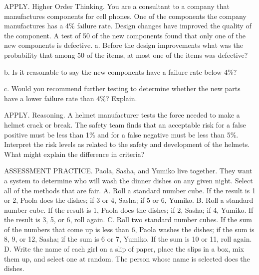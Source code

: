 \documentclass{article}
\newenvironment{practice}[2]{}{}        %
\newcommand{\answer}[1]{}               %
\newcommand{\uncertain}[2]{#1}          %
\newcommand{\te}[1]{}                   %
\begin{document}
\begin{practice}{22}{3}
APPLY. Higher Order Thinking. You are a consultant to a company that manufactures components for cell phones. One of the components the company manufactures has a 4\% failure rate. Design changes have improved the quality of the component. A test of 50 of the new components found that only one of the new components is defective.
a. Before the design improvements what was the probability that among 50 of the items, at most one of the items was defective?
\answer{a. 40\% (rounded to the nearest whole percent)}
b. Is it reasonable to say the new components have a failure rate below 4\%?
\answer{b. Based on the test of 50 new components, the experimental probability for failure is 2\%. However, 50 is a relatively small sample, so I think that it is not reasonable to conclude that the new components have a lower failure rate than 4\%.}
c. Would you recommend further testing to determine whether the new parts have a lower failure rate than 4\%? Explain.
\answer{c. Further testing of the new parts is recommended, since 50 is a relatively small sample.}
\end{practice}
\begin{practice}{23}{3}
APPLY. Reasoning. A helmet manufacturer tests the force needed to make a helmet crack or break. The safety team finds that an acceptable risk for a false positive must be less than 1\% and for a false negative must be less than 5\%. Interpret the risk levels as related to the safety and development of the helmets. What might explain the difference in criteria?
\te{DOK \uncertain{3}{2}: item 23 is absent from the printed Item Analysis and has no printed DOK beside the prompt.}
\answer{Possible answer: In this scenario, a false positive would mean that a helmet passed inspection but then failed in an accident or when pressure is applied. This could mean serious injury for a skateboarder using the helmet, so it makes sense that the company wants to minimize this risk. A possible reason for the false negative to be higher is that the company will still make enough profit to cover setting aside a few helmets that tested defective but that are actually safe to use.}
\end{practice}
\begin{practice}{24}{2}
ASSESSMENT PRACTICE. Paola, Sasha, and Yumiko live together. They want a system to determine who will wash the dinner dishes on any given night. Select all of the methods that are fair.
A. Roll a standard number cube. If the result is 1 or 2, Paola does the dishes; if 3 or 4, Sasha; if 5 or 6, Yumiko.
B. Roll a standard number cube. If the result is 1, Paola does the dishes; if 2, Sasha; if 4, Yumiko. If the result is 3, 5, or 6, roll again.
C. Roll two standard number cubes. If the sum of the numbers that come up is less than 6, Paola washes the dishes; if the sum is 8, 9, or 12, Sasha; if the sum is 6 or 7, Yumiko. If the sum is 10 or 11, roll again.
D. Write the name of each girl on a slip of paper, place the slips in a box, mix them up, and select one at random. The person whose name is selected does the dishes.
\answer{A, B, D}
\end{practice}
\end{document}

